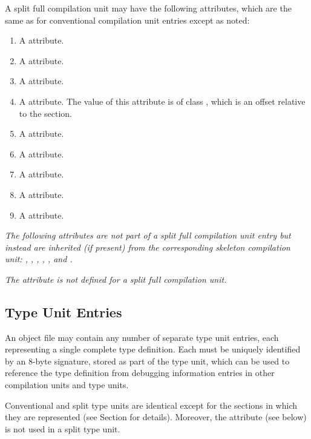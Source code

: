 A split full compilation unit 
may have the following attributes, 
which are the same as for conventional compilation unit entries 
except as noted:
\begin{enumerate}[1. ]
\item A \DWATname{} attribute.
\bb
\item A \DWATlanguagename{} attribute.
\item A \DWATlanguageversion{} attribute.
\eb
\item A \DWATmacros{} attribute.
The value of this attribute is of class \CLASSmacptr{}, which is 
an offset relative to the \dotdebugmacrodwo{} section.
\item A \DWATproducer{} attribute.        
\item A \DWATidentifiercase{} attribute.
\item A \DWATmainsubprogram{} attribute.
\item A \DWATentrypc{} attribute.
\item A \DWATuseUTFeight{} attribute.

\end{enumerate}

\textit{The following attributes are not part of a 
split full compilation unit entry but instead are inherited 
(if present) from the corresponding skeleton compilation unit: 
\DWATlowpc, \DWAThighpc, \DWATranges, \DWATstmtlist, \DWATcompdir,
\bb 
\DWATstroffsets{} and \DWATaddrbase{}.
\eb
}

\textit{The \DWATbasetypes{} attribute is not defined for a
split full compilation unit.}


\subsection{Type Unit Entries}
\label{chap:typeunitentries}
An object file may contain any number of separate type
unit entries, each representing a single complete type
definition. 
Each  must be uniquely identified by
an 8-byte signature, stored as part of the type unit, which
can be used to reference the type definition from debugging
information entries in other compilation units and type units.

Conventional and split type units are identical except for
the sections in which they are represented 
(see Section  for details).
Moreover, the 
\bb
\DWATstroffsets{} 
\eb
attribute (see below) is not 
used in a split type unit.

